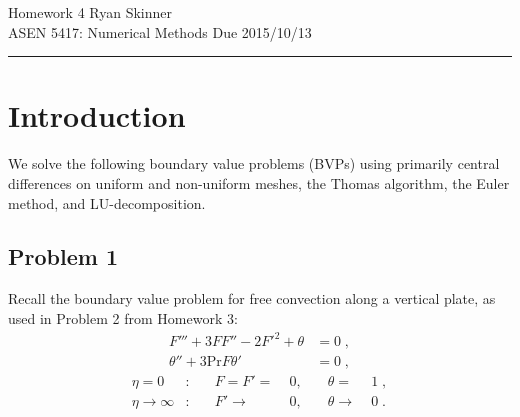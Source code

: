 \documentclass[11pt]{article}
\begin{document}
\pagestyle{fancyplain}
\lhead{}
\chead{}
\rhead{}
\cfoot{\hrule \thepage}

\noindent
{\Large Homework 4}
\hfill
{\large Ryan Skinner}
\\[0.5ex]
{\large ASEN 5417: Numerical Methods}
\hfill
{\large Due 2015/10/13}\\
\hrule
\vspace{6pt}

\section{Introduction} %

We solve the following boundary value problems (BVPs) using primarily central differences on uniform and non-uniform meshes, the Thomas algorithm, the Euler method, and LU-decomposition.

\subsection{Problem 1}

Recall the boundary value problem for free convection along a vertical plate, as used in Problem 2 from Homework 3:
\begin{equation}
\begin{aligned}
F''' + 3 F F'' - 2F'^2 + \theta &= 0 \;, \\
\theta'' + 3 \text{Pr} F \theta' &= 0 \;,
\end{aligned}
\label{eq:prob1_original}
\end{equation}
\begin{equation}
\begin{aligned}
\eta = 0 &: &\quad F = F' =\; &0, &\quad \theta =\; &1 \;, \\
\eta \rightarrow \infty &: &\quad F' \rightarrow\; &0, &\quad \theta \rightarrow\; &0
\;.
\end{aligned}
\label{eq:prob1_original_bcs}
\end{equation}
\end{document}
